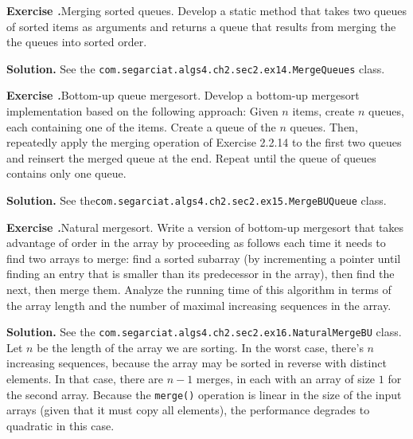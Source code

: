 \documentclass[12pt, a4paper]{article}
\newenvironment{ex}[2][Exercise]
{\par\medskip\noindent \textbf{#1 #2.}}
{\medskip}
\newenvironment{sol}[1][Solution]
{\par\medskip\noindent \textbf{#1.} }
{\medskip}
\begin{document}
	\begin{ex}{14}
		\emph{Merging sorted queues}. Develop a static method that takes two queues of sorted
		items as arguments and returns a queue that results from merging the the queues
		into sorted order.
	\end{ex}
	\begin{sol}
		See the \texttt{com.segarciat.algs4.ch2.sec2.ex14.MergeQueues} class.
	\end{sol}
	\begin{ex}{15}
		\emph{Bottom-up queue mergesort}. Develop a bottom-up mergesort implementation based
		on the following approach: Given $n$ items, create $n$ queues, each containing one
		of the items. Create a queue of the $n$ queues. Then, repeatedly apply the merging
		operation of Exercise 2.2.14 to the first two queues and reinsert the merged queue
		at the end. Repeat until the queue of queues contains only one queue.
	\end{ex}
	\begin{sol}
		See the\texttt{com.segarciat.algs4.ch2.sec2.ex15.MergeBUQueue} class.
	\end{sol}
	\begin{ex}{16}
		\emph{Natural mergesort}. Write a version of bottom-up mergesort that takes advantage
		of order in the array by proceeding as follows each time it needs to find
		two arrays to merge: find a sorted subarray (by incrementing a pointer until
		finding an entry that is smaller than its predecessor in the array), then find
		the next, then merge them. Analyze the running time of this algorithm in terms
		of the array length and the number of maximal increasing sequences in the array.
	\end{ex}
	\begin{sol}
		See the \texttt{com.segarciat.algs4.ch2.sec2.ex16.NaturalMergeBU} class.
		Let $n$ be the length of the array we are sorting. In the worst case,
		there's $n$ increasing sequences, because the array may be sorted in
		reverse with distinct elements. In that case, there are $n-1$ merges,
		in each with an array of size $1$ for the second array.
		Because the \texttt{merge()} operation is linear in the size of the
		input arrays (given that it must copy all elements), the performance
		degrades to quadratic in this case.
	\end{sol}
	\pagebreak
	\printbibliography
\end{document}
